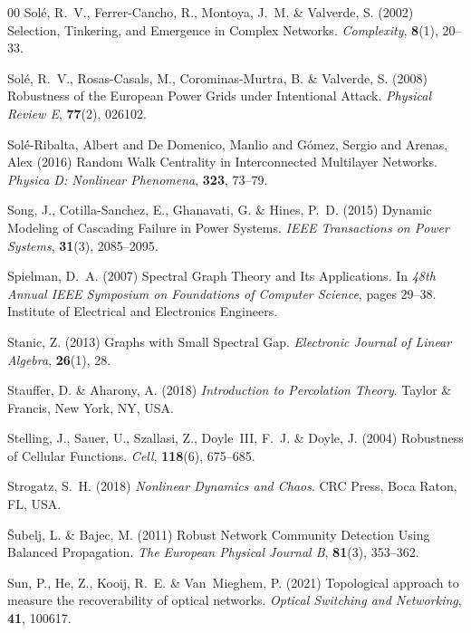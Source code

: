 \documentclass{comnet-mod}
\begin{document}
\begin{thebibliography}{00}
Sol{\'e}, R.~V., {Ferrer-Cancho}, R., Montoya, J.~M. {\&} Valverde, S. (2002)
  {Selection, Tinkering, and Emergence in Complex Networks}. {\em
  {Complexity}}, \textbf{8}(1), 20--33.

Sol{\'e}, R.~V., {Rosas-Casals}, M., {Corominas-Murtra}, B. {\&} Valverde, S.
  (2008)  {Robustness of the {{European}} Power Grids under Intentional
  Attack}. {\em {Physical Review E}}, \textbf{77}(2), 026102.

{Sol\'e-Ribalta, Albert and De Domenico, Manlio and G\'omez, Sergio and Arenas,
  Alex} (2016)  {Random Walk Centrality in Interconnected Multilayer Networks}.
  {\em {Physica D: Nonlinear Phenomena}}, \textbf{323}, 73--79.

Song, J., {Cotilla-Sanchez}, E., Ghanavati, G. {\&} Hines, P.~D. (2015)
  {Dynamic Modeling of Cascading Failure in Power Systems}. {\em {IEEE
  Transactions on Power Systems}}, \textbf{31}(3), 2085--2095.

Spielman, D.~A. (2007)  {Spectral Graph Theory and Its Applications}. In {\em
  {48th Annual {{IEEE}} Symposium on Foundations of Computer Science}}, pages
  29--38. {Institute of Electrical and Electronics Engineers}.

Stanic, Z. (2013)  {Graphs with Small Spectral Gap}. {\em {Electronic Journal
  of Linear Algebra}}, \textbf{26}(1), 28.

Stauffer, D. {\&} Aharony, A. (2018) {\em {Introduction to Percolation
  Theory}}.
{Taylor \& Francis}, {New York, NY, USA}.

Stelling, J., Sauer, U., Szallasi, Z., Doyle~III, F.~J. {\&} Doyle, J. (2004)
  {Robustness of Cellular Functions}. {\em {Cell}}, \textbf{118}(6), 675--685.

Strogatz, S.~H. (2018) {\em {Nonlinear Dynamics and Chaos}}.
{CRC Press}, {Boca Raton, FL, USA}.

{\v S}ubelj, L. {\&} Bajec, M. (2011)  {Robust Network Community Detection
  Using Balanced Propagation}. {\em {The European Physical Journal B}},
  \textbf{81}(3), 353--362.

Sun, P., He, Z., Kooij, R.~E. {\&} Van~Mieghem, P. (2021)  Topological approach
  to measure the recoverability of optical networks. {\em {Optical Switching
  and Networking}}, \textbf{41}, 100617.


\end{thebibliography}
\end{document}
